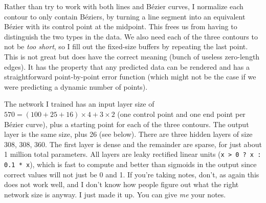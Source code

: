 \documentclass[twocolumn]{article}
\begin{document}

Rather than try to work with both lines and B\'ezier curves, I
normalize each contour to only contain B\'eziers, by turning a line
segment into an equivalent B\'ezier with its control point at the
midpoint. This frees us from having to distinguish the two types in
the data. We also need each of the three contours to not be {\em too
  short}, so I fill out the fixed-size buffers by repeating the last
point. This is not great but does have the correct meaning (bunch of
useless zero-length edges). It has the property that any predicted
data can be rendered and has a straightforward point-by-point error
function (which might not be the case if we were predicting a dynamic
number of points).

The network I trained has an input layer size of $570 = (100 + 25 + 16)
\times 4 + 3 \times 2$ (one control point and one end point per
B\'ezier curve), plus a starting point for each of the three contours.
The output layer is the same size, plus 26 (see below). There are
three hidden layers of size 308, 308, 360. The first layer is dense
and the remainder are sparse,
for just about 1 million total parameters. All layers are leaky
rectified linear units ({\tt x > 0 ? x : 0.1 * x}), which is fast to
compute and better than sigmoids in the output since correct values
will not just be 0 and 1. If you're taking notes, don't, as again this
does not work well, and I don't know how people figure out what the
right network size is anyway. I just made it up. You can give {\em me}
your notes.
\end{document}
